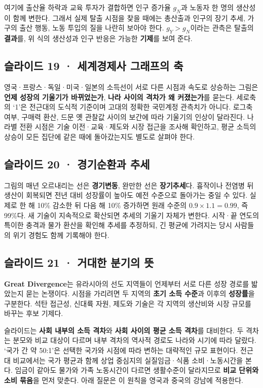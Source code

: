 \documentclass[10pt,a4paper]{article}
\begin{document}
여기에 출산율 하락과 교육 투자가 결합하면 인구 증가율 $g_N$과 노동자 한 명의 생산성이 함께 변한다. 그래서 실제 탈출 시점을 찾을 때에는 총산출과 인구의 장기 추세, 가구의 출산 행동, 노동 투입의 질을 나란히 보아야 한다. $g_Y>g_N$이라는 관측은 탈출의 \textbf{결과}를, 위 식의 생산성과 인구 반응은 가능한 \textbf{기제}를 보여 준다.\par

\subsection{슬라이드 19 · 세계경제사 그래프의 축}
영국·프랑스·독일·미국·일본의 소득선이 서로 다른 시점과 속도로 상승하는 그림은 \textbf{언제 성장의 기울기가 바뀌었는가}, \textbf{나라 사이의 격차가 왜 커졌는가}를 묻는다. 세로축의 ‘1’은 전근대의 도식적 기준이며 고대의 정확한 국민계정 관측치가 아니다. 로그축 여부, 구매력 환산, 드문 옛 관찰값 사이의 보간에 따라 기울기의 인상이 달라진다. 나라별 전환 시점은 기술 이전·교육·제도와 시장 접근을 조사해 확인하고, 평균 소득의 상승이 모든 집단에 같은 때에 돌아갔는지도 별도로 살펴야 한다.\par

\subsection{슬라이드 20 · 경기순환과 추세}
그림의 매년 오르내리는 선은 \textbf{경기변동}, 완만한 선은 \textbf{장기추세}다. 흉작이나 전염병 뒤 생산이 회복되면 전년 대비 성장률이 높아도 예전 수준으로 돌아가는 중일 수 있다. 실제로 한 해 10\% 감소한 뒤 다음 해 10\% 증가하면 원래 수준의 $0.9\times1.1=0.99$, 즉 99\%다. 새 기술이 지속적으로 확산되면 추세의 기울기 자체가 변한다. 시작·끝 연도의 특이한 충격과 물가 환산을 확인해 추세를 추정하되, 긴 평균에 가려지는 당시 사람들의 위기 경험도 함께 기록해야 한다.\par

\subsection{슬라이드 21 · 거대한 분기의 뜻}
\textbf{Great Divergence}는 유라시아의 선도 지역들이 언제부터 서로 다른 성장 경로를 밟았는지 묻는 논쟁이다. 시점을 가리려면 두 지역의 \textbf{초기 소득 수준}과 이후의 \textbf{성장률}을 구분한다. 석탄 접근성, 신대륙 자원, 제도와 기술은 각 지역의 생산비와 시장 규모를 바꾸는 후보 기제다.\par

슬라이드는 \textbf{사회 내부의 소득 격차}와 \textbf{사회 사이의 평균 소득 격차}를 대비한다. 두 격차는 분모와 비교 대상이 다르며 내부 격차의 역사적 경로도 나라와 시기에 따라 달랐다. ‘국가 간 약 50:1’은 선택한 국가와 시점에 따라 변하는 대략적인 규모 표현이다. 전근대 비교에서는 국가 평균과 함께 상업 중심지의 실질임금·식품 소비·노동시간을 본다. 임금이 같아도 물가와 가족 노동시간이 다르면 생활수준이 달라지므로 \textbf{비교 단위와 소비 묶음}을 먼저 맞춘다. 아래 질문은 이 원칙을 영국과 중국의 강남에 적용한다.\par
\end{document}
